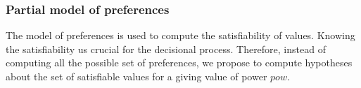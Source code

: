 \documentclass{llncs}
\begin{document}
	
	\subsubsection{Partial model of preferences}
		The model of preferences is used to compute the satisfiability of values. Knowing the satisfiability us crucial for the decisional process. Therefore, instead of computing all the possible set of preferences, we propose to compute hypotheses about the set of satisfiable values for a giving value of power $pow$.   
	
	
	
	
	

	
	
	
	
\end{document}

